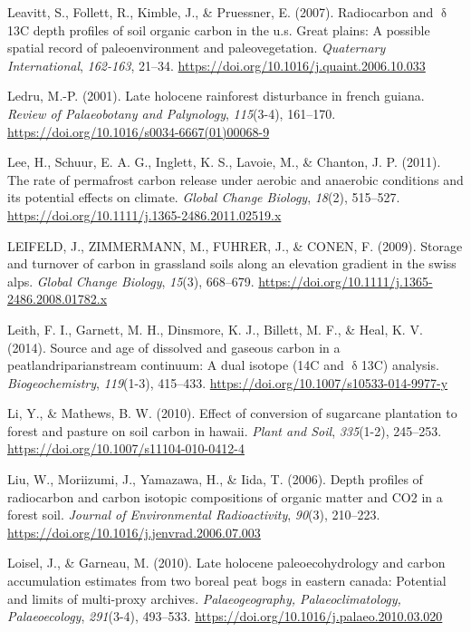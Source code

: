\documentclass[]{article}
\begin{document}
\leavevmode\hypertarget{ref-Leavitt_2007}{}%
Leavitt, S., Follett, R., Kimble, J., \& Pruessner, E. (2007).
Radiocarbon and \(\updelta\)13C depth profiles of soil organic carbon in
the u.s. Great plains: A possible spatial record of paleoenvironment and
paleovegetation. \emph{Quaternary International}, \emph{162-163},
21--34. \url{https://doi.org/10.1016/j.quaint.2006.10.033}

\leavevmode\hypertarget{ref-Ledru_2001}{}%
Ledru, M.-P. (2001). Late holocene rainforest disturbance in french
guiana. \emph{Review of Palaeobotany and Palynology}, \emph{115}(3-4),
161--170. \url{https://doi.org/10.1016/s0034-6667(01)00068-9}

\leavevmode\hypertarget{ref-Lee_2011}{}%
Lee, H., Schuur, E. A. G., Inglett, K. S., Lavoie, M., \& Chanton, J. P.
(2011). The rate of permafrost carbon release under aerobic and
anaerobic conditions and its potential effects on climate. \emph{Global
Change Biology}, \emph{18}(2), 515--527.
\url{https://doi.org/10.1111/j.1365-2486.2011.02519.x}

\leavevmode\hypertarget{ref-LEIFELD_2009}{}%
LEIFELD, J., ZIMMERMANN, M., FUHRER, J., \& CONEN, F. (2009). Storage
and turnover of carbon in grassland soils along an elevation gradient in
the swiss alps. \emph{Global Change Biology}, \emph{15}(3), 668--679.
\url{https://doi.org/10.1111/j.1365-2486.2008.01782.x}

\leavevmode\hypertarget{ref-Leith_2014}{}%
Leith, F. I., Garnett, M. H., Dinsmore, K. J., Billett, M. F., \& Heal,
K. V. (2014). Source and age of dissolved and gaseous carbon in a
peatlandriparianstream continuum: A dual isotope (14C and
\(\updelta\)13C) analysis. \emph{Biogeochemistry}, \emph{119}(1-3),
415--433. \url{https://doi.org/10.1007/s10533-014-9977-y}

\leavevmode\hypertarget{ref-Li_2010}{}%
Li, Y., \& Mathews, B. W. (2010). Effect of conversion of sugarcane
plantation to forest and pasture on soil carbon in hawaii. \emph{Plant
and Soil}, \emph{335}(1-2), 245--253.
\url{https://doi.org/10.1007/s11104-010-0412-4}

\leavevmode\hypertarget{ref-Liu_2006}{}%
Liu, W., Moriizumi, J., Yamazawa, H., \& Iida, T. (2006). Depth profiles
of radiocarbon and carbon isotopic compositions of organic matter and
CO2 in a forest soil. \emph{Journal of Environmental Radioactivity},
\emph{90}(3), 210--223.
\url{https://doi.org/10.1016/j.jenvrad.2006.07.003}

\leavevmode\hypertarget{ref-Loisel_2010}{}%
Loisel, J., \& Garneau, M. (2010). Late holocene paleoecohydrology and
carbon accumulation estimates from two boreal peat bogs in eastern
canada: Potential and limits of multi-proxy archives.
\emph{Palaeogeography, Palaeoclimatology, Palaeoecology},
\emph{291}(3-4), 493--533.
\url{https://doi.org/10.1016/j.palaeo.2010.03.020}
\end{document}
